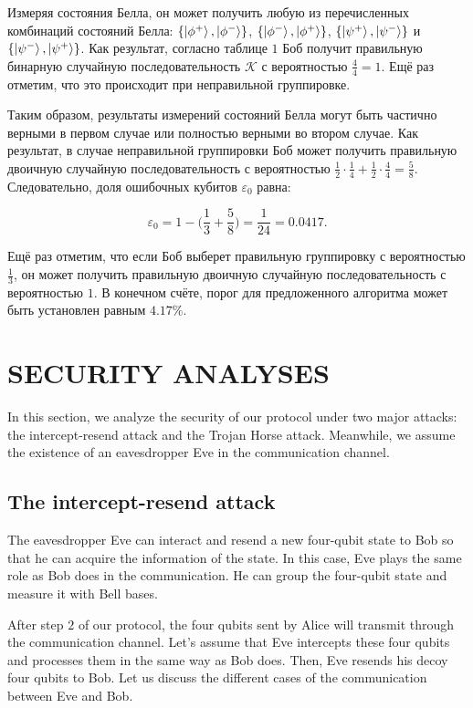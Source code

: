 \documentclass[a4paper,11pt]{article}
\begin{document}
Измеряя состояния Белла, он может получить любую из перечисленных комбинаций состояний Белла: $\{\ket{\phi^+}, \ket{\phi^-}\}$, $\{\ket{\phi^-}, \ket{\phi^+}\}$, $\{\ket{\psi^+}, \ket{\psi^-}\}$ и $\{\ket{\psi^-}, \ket{\psi^+}\}$. Как результат, согласно таблице $1$ Боб получит правильную бинарную случайную последовательность $\mathcal{K}$ с вероятностью $\frac{4}{4} = 1$. Ещё раз отметим, что это происходит при неправильной группировке.

Таким образом, результаты измерений состояний Белла могут быть частично верными в первом случае или полностью верными во втором случае. Как результат, в случае неправильной группировки Боб может получить правильную двоичную случайную последовательность с вероятностью $\frac{1}{2} \cdot \frac{1}{4} + \frac{1}{2} \cdot \frac{4}{4} = \frac{5}{8}$. Следовательно, доля ошибочных кубитов $\varepsilon_0$ равна:

\begin{equation*}
\varepsilon_0 = 1 - \Big(\dfrac{1}{3} + \dfrac{5}{8}\Big) = \dfrac{1}{24} = 0.0417.
\end{equation*}

Ещё раз отметим, что если Боб выберет правильную группировку с вероятностью $\frac{1}{3}$, он может получить правильную двоичную случайную последовательность с вероятностью $1$. В конечном счёте, порог для предложенного алгоритма может быть установлен равным $4.17\%$.

\section{SECURITY ANALYSES}
In this section, we analyze the security of our protocol under two major attacks: the intercept-resend attack and the Trojan Horse attack. Meanwhile, we assume the existence of
an eavesdropper Eve in the communication channel.

\subsection{The intercept-resend attack}
The eavesdropper Eve can interact and resend a new four-qubit state to Bob so that he can acquire the information of the state. In this case, Eve plays the same role as Bob does in the communication. He can group the four-qubit state and measure it with Bell bases.

After step $2$ of our protocol, the four qubits sent by Alice will transmit through the communication channel. Let’s assume that Eve intercepts these four qubits and processes
them in the same way as Bob does. Then, Eve resends his decoy four qubits to Bob. Let us discuss the different cases of the communication between Eve and Bob.
\end{document}
